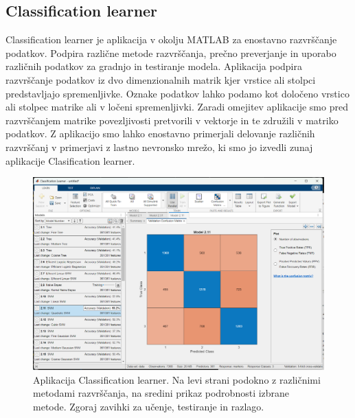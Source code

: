 \subsection{Classification learner}
Classification learner je aplikacija v okolju MATLAB za enostavno razvrščanje podatkov. Podpira različne metode razvrščanja, prečno preverjanje in uporabo različnih podatkov za gradnjo in testiranje modela. Aplikacija podpira razvrščanje podatkov iz dvo dimenzionalnih matrik kjer vrstice ali stolpci predstavljajo spremenljivke. Oznake podatkov lahko podamo kot določeno vrstico ali stolpec matrike ali v ločeni spremenljivki. Zaradi omejitev aplikacije smo pred razvrščanjem matrike povezljivosti pretvorili v vektorje in te združili v matriko podatkov. Z aplikacijo smo lahko enostavno primerjali delovanje različnih razvrščanj v primerjavi z lastno nevronsko mrežo, ki smo jo izvedli zunaj aplikacije Clasification learner.
\begin{figure}[h!]
    \begin{center}
    \includegraphics[width=1\linewidth]{slike/ClasificationLearner.png}
    \end{center}
    \caption[Aplikacija Classification learner.]{Aplikacija Classification learner. Na levi strani podokno z različnimi metodami razvrščanja, na sredini prikaz podrobnosti izbrane metode. Zgoraj zavihki za učenje, testiranje in razlago. }
    \end{figure}

